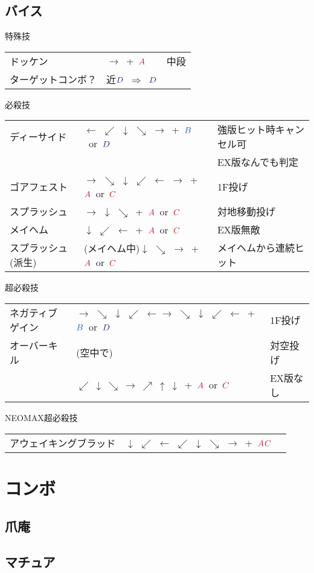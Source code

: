 \documentclass[a4j,11pt]{jarticle}
\def\A{$\textcolor{Acolor}{A}$}
\def\C{$\textcolor{Ccolor}{C}$}
\def\B{$\textcolor{Bcolor}{B}$}
\def\D{$\textcolor{Dcolor}{D}$}
\def\hado{$\downarrow$ $\searrow$ $\rightarrow$}%
\def\tatsu{$\downarrow$ $\swarrow$ $\leftarrow$}%
\def\syoryu{$\rightarrow$ $\downarrow$ $\searrow$}%
\def\yoga{$\leftarrow$ $\swarrow$ $\downarrow$ $\searrow$ $\rightarrow$}%
\def\gyakuyoga{$\rightarrow$ $\searrow$ $\downarrow$ $\swarrow$ $\leftarrow$}%
\def\tenti{$\rightarrow$ $\searrow$ $\downarrow$ $\swarrow$ $\leftarrow$ $\rightarrow$}%
\def\orochi{$\downarrow$ $\swarrow$ $\leftarrow$ $\swarrow$ $\downarrow$ $\searrow$ $\rightarrow$}%
\def\Cancel{$\Longrightarrow$}
\begin{document}
\subsection{バイス}
\begin{itembox}[l]{特殊技}
\begin{tabular}{lll}
ドッケン&$\rightarrow$\ +\ \A&中段\\%
ターゲットコンボ？&近\D\ \Cancel\ \D&%
\end{tabular}
\end{itembox}
\begin{itembox}[l]{必殺技}
\begin{tabular}{lll}
ディーサイド&\yoga\ +\ \B\ or\ \D&強版ヒット時キャンセル可\\
&&EX版なんでも判定\\%
ゴアフェスト&\tenti\ +\ \A\ or\ \C&1F投げ\\%
スプラッシュ&\syoryu\ +\ \A\ or\ \C&対地移動投げ\\%
メイヘム&\tatsu\ +\ \A\ or\ \C&EX版無敵\\%
スプラッシュ(派生)&(メイヘム中)\hado\ +\ \A\ or\ \C&メイヘムから連続ヒット%
\end{tabular}
\end{itembox}
\begin{itembox}[l]{超必殺技}
\begin{tabular}{lll}
ネガティブゲイン&\gyakuyoga\gyakuyoga\ +\ \B\ or\ \D&1F投げ\\%
オーバーキル&(空中で)&対空投げ \\%
&$\swarrow\ \downarrow\ \searrow\ \rightarrow\ \nearrow\ \uparrow\
\downarrow$\ +\ \A\ or\ \C&EX版なし
\end{tabular}
\end{itembox}
\begin{itembox}[l]{NEOMAX超必殺技}
\begin{tabular}{lll}
アウェイキングブラッド&\orochi\ +\ \A\C&%
\end{tabular}
\end{itembox}
\newpage
\section{コンボ}
\subsection{爪庵}
\subsection{マチュア}
\newpage
\end{document}
